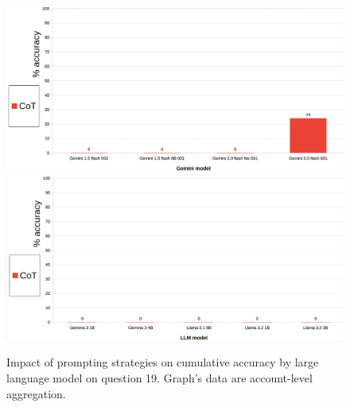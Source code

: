 \documentclass[12pt]{article}
\begin{document}
\begin{figure}[H]
    \centering
            \includegraphics[width=1\textwidth]{q307Gemini.png}
            \includegraphics[width=1\textwidth]{q307Other.png}
    \caption[Accuracy on Question 19 by LLM]{Impact of prompting strategies on cumulative accuracy by large language model on question 19. Graph's data are account-level aggregation.}
    \end{figure} 

\vspace{2cm}

\end{document}
